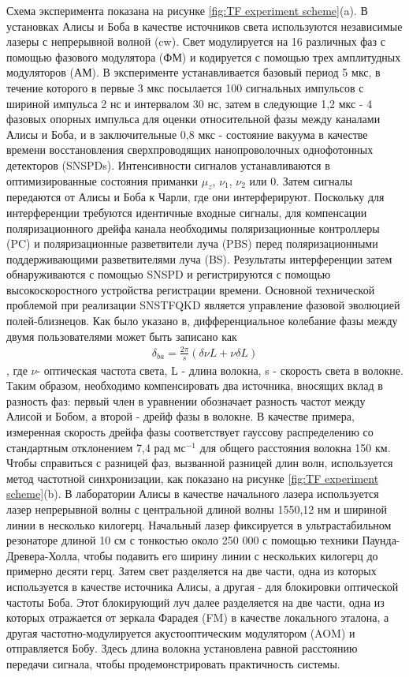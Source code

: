 Схема эксперимента показана на рисунке \ref{fig:TF experiment scheme}(a). В установках Алисы и Боба в качестве источников света используются независимые лазеры с непрерывной волной (cw). Свет модулируется на 16 различных фаз с помощью фазового модулятора (ФМ) и кодируется с помощью трех амплитудных модуляторов (АМ). В эксперименте устанавливается базовый период 5 мкс, в течение которого в первые 3 мкс посылается 100 сигнальных импульсов с шириной импульса 2 нс и интервалом 30 нс, затем в следующие 1,2 мкс - 4 фазовых опорных импульса для оценки относительной фазы между каналами Алисы и Боба, и в заключительные 0,8 мкс - состояние вакуума в качестве времени восстановления сверхпроводящих нанопроволочных однофотонных детекторов (SNSPDs). Интенсивности сигналов устанавливаются в оптимизированные состояния приманки $\mu_z$, $\nu_1$, $\nu_2$ или 0. Затем сигналы передаются от Алисы и Боба к Чарли, где они интерферируют. Поскольку для интерференции требуются идентичные входные сигналы, для компенсации поляризационного дрейфа канала необходимы поляризационные контроллеры (PC) и поляризационные разветвители луча (PBS) перед поляризационными поддерживающими разветвителями луча (BS). Результаты интерференции затем обнаруживаются с помощью SNSPD и регистрируются с помощью высокоскоростного устройства регистрации времени. Основной технической проблемой при реализации SNSTFQKD является управление фазовой эволюцией полей-близнецов. Как было указано в, дифференциальное колебание фазы между двумя пользователями может быть записано как
\begin{align}
    \delta_{ba} = \frac{2\pi}{s}(\delta\nu L + \nu\delta L)
    \label{eq: TF phase fluct lit}
\end{align},
 где $\nu$- оптическая частота света, L - длина волокна, s - скорость света в волокне. Таким образом, необходимо компенсировать два источника, вносящих вклад в разность фаз: первый член в уравнении обозначает разность частот между Алисой и Бобом, а второй - дрейф фазы в волокне. В качестве примера, измеренная скорость дрейфа фазы соответствует гауссову распределению со стандартным отклонением 7,4 рад $мс^{-1}$ для общего расстояния волокна 150 км. Чтобы справиться с разницей фаз, вызванной разницей длин волн, используется метод частотной синхронизации, как показано на рисунке \ref{fig:TF experiment scheme}(b). В лаборатории Алисы в качестве начального лазера используется лазер непрерывной волны с центральной длиной волны 1550,12 нм и шириной линии в несколько килогерц. Начальный лазер фиксируется в ультрастабильном резонаторе длиной 10 см с тонкостью около 250 000 с помощью техники Паунда-Древера-Холла, чтобы подавить его ширину линии с нескольких килогерц до примерно десяти герц. Затем свет разделяется на две части, одна из которых используется в качестве источника Алисы, а другая - для блокировки оптической частоты Боба. Этот блокирующий луч далее разделяется на две части, одна из которых отражается от зеркала Фарадея (FM) в качестве локального эталона, а другая частотно-модулируется акустооптическим модулятором (AOM) и отправляется Бобу. Здесь длина волокна установлена равной расстоянию передачи сигнала, чтобы продемонстрировать практичность системы.

